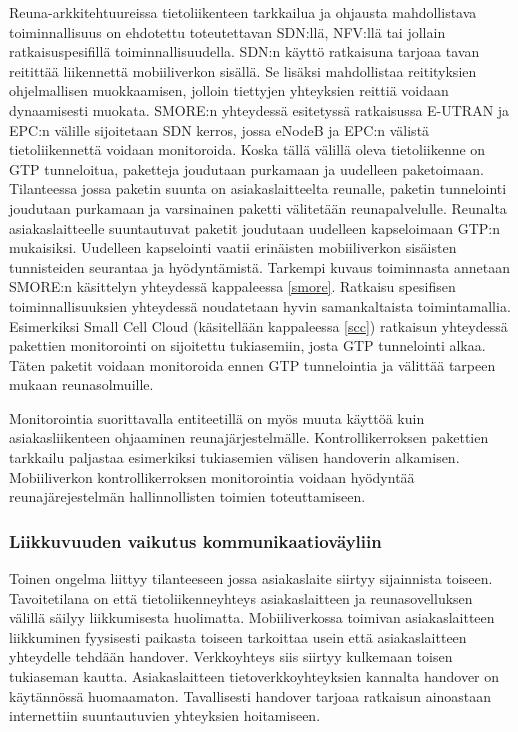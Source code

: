 Reuna-arkkitehtuureissa tietoliikenteen tarkkailua ja ohjausta mahdollistava toiminnallisuus on ehdotettu toteutettavan SDN:llä, NFV:llä tai jollain ratkaisuspesifillä toiminnallisuudella. 
SDN:n käyttö ratkaisuna tarjoaa tavan reitittää liikennettä mobiiliverkon sisällä. Se lisäksi mahdollistaa reitityksien ohjelmallisen muokkaamisen, jolloin tiettyjen yhteyksien reittiä voidaan dynaamisesti muokata. SMORE:n yhteydessä esitetyssä ratkaisussa  E-UTRAN ja EPC:n välille sijoitetaan SDN kerros, jossa eNodeB ja EPC:n välistä tietoliikennettä voidaan monitoroida. 
Koska tällä välillä oleva tietoliikenne on GTP tunneloitua, paketteja joudutaan purkamaan ja uudelleen paketoimaan. 
Tilanteessa jossa paketin suunta on asiakaslaitteelta reunalle, paketin tunnelointi joudutaan purkamaan ja varsinainen paketti välitetään reunapalvelulle. 
Reunalta asiakaslaitteelle suuntautuvat paketit joudutaan uudelleen kapseloimaan GTP:n mukaisiksi.
Uudelleen kapselointi vaatii erinäisten mobiiliverkon sisäisten tunnisteiden seurantaa ja hyödyntämistä.
Tarkempi kuvaus toiminnasta annetaan SMORE:n käsittelyn yhteydessä kappaleessa \ref{smore}.
Ratkaisu spesifisen toiminnallisuuksien yhteydessä noudatetaan hyvin samankaltaista toimintamallia. Esimerkiksi Small Cell Cloud (käsitellään kappaleessa \ref{scc}) ratkaisun yhteydessä pakettien monitorointi on sijoitettu tukiasemiin, josta GTP tunnelointi alkaa.
Täten paketit voidaan monitoroida ennen GTP tunnelointia ja välittää tarpeen mukaan reunasolmuille.

Monitorointia suorittavalla entiteetillä on myös muuta käyttöä kuin asiakasliikenteen ohjaaminen reunajärjestelmälle.
Kontrollikerroksen pakettien tarkkailu paljastaa esimerkiksi tukiasemien välisen handoverin alkamisen.
Mobiiliverkon kontrollikerroksen monitorointia voidaan hyödyntää reunajärejestelmän hallinnollisten toimien toteuttamiseen.

\subsubsection*{Liikkuvuuden vaikutus kommunikaatioväyliin}

Toinen ongelma liittyy tilanteeseen jossa asiakaslaite siirtyy sijainnista toiseen. Tavoitetilana on että tietoliikenneyhteys asiakaslaitteen ja reunasovelluksen välillä säilyy liikkumisesta huolimatta.  
Mobiiliverkossa toimivan asiakaslaitteen liikkuminen fyysisesti paikasta toiseen tarkoittaa usein että asiakaslaitteen yhteydelle tehdään handover.
Verkkoyhteys siis siirtyy kulkemaan toisen tukiaseman kautta. 
Asiakaslaitteen tietoverkkoyhteyksien kannalta handover on käytännössä huomaamaton.
Tavallisesti handover tarjoaa ratkaisun ainoastaan internettiin suuntautuvien yhteyksien hoitamiseen.
 

